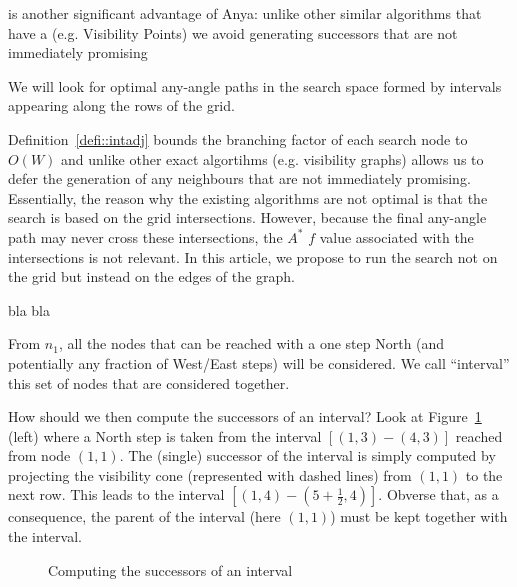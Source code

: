 is another significant advantage of Anya: unlike other similar
algorithms that have a (e.g. Visibility Points) we avoid generating successors that 
are not immediately promising

We will look for optimal any-angle paths in the search space formed by
intervals appearing along the rows of the grid.
%

Definition~\ref{defi::intadj} bounds the branching factor of each 
search node to $O(W)$ and unlike other exact algortihms (e.g. visibility graphs)
allows us to defer the generation of any neighbours that are not 
immediately promising.
\\

Essentially, the reason why the existing algorithms are not optimal
is that the search is based on the grid intersections.  
However, because the final any-angle path 
may never cross these intersections, 
the $A^*$ $f$ value associated with the intersections
is not relevant.  
In this article, we propose to run the search not on the grid 
but instead on the edges of the graph.  

bla bla

From $n_1$, all the nodes that can be reached with a one step North 
(and potentially any fraction of West/East steps) will be considered.  
We call ``interval'' this set of nodes that are considered together.  

How should we then compute the successors of an interval?  
Look at Figure~\ref{fig::succ1} (left) 
where a North step is taken from the interval $[(1,3)-(4,3)]$
reached from node $(1,1)$.  
The (single) successor of the interval 
is simply computed by projecting the visibility cone 
(represented with dashed lines)
from $(1,1)$ to the next row.  
This leads to the interval $[(1,4)-(5+\frac{1}{2},4)]$.  
Obverse that, as a consequence, the parent of the interval 
(here $(1,1)$) must be kept together with the interval.  

\begin{figure}[ht]
  \begin{minipage}{0.5\linewidth}
  \begin{center}
    
  \end{center}
  \end{minipage}
  \begin{minipage}{0.5\linewidth}
  \begin{center}
    
  \end{center}
  \end{minipage}
  \caption{Computing the successors of an interval}
  \label{fig::succ1}
\end{figure}

